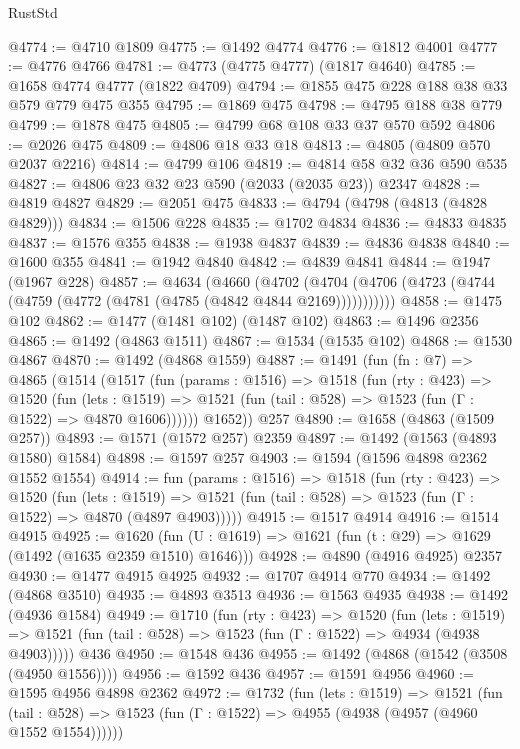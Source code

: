 \begin{lexlean}{RustStd}
\begin{coremodule}
{\begin{coremodule}
{{{{{{{{{{{{{@4774 := @4710 @1809
@4775 := @1492 @4774
@4776 := @1812 @4001
@4777 := @4776 @4766
@4781 := @4773 (@4775 @4777) (@1817 @4640)
@4785 := @1658 @4774 @4777 (@1822 @4709)
@4794 := @1855 @475 @228 @188 @38 @33 @579 @779 @475 @355
@4795 := @1869 @475
@4798 := @4795 @188 @38 @779
@4799 := @1878 @475
@4805 := @4799 @68 @108 @33 @37 @570 @592
@4806 := @2026 @475
@4809 := @4806 @18 @33 @18
@4813 := @4805 (@4809 @570 @2037 @2216)
@4814 := @4799 @106
@4819 := @4814 @58 @32 @36 @590 @535
@4827 := @4806 @23 @32 @23 @590 (@2033 (@2035 @23)) @2347
@4828 := @4819 @4827
@4829 := @2051 @475
@4833 := @4794 (@4798 (@4813 (@4828 @4829)))
@4834 := @1506 @228
@4835 := @1702 @4834
@4836 := @4833 @4835
@4837 := @1576 @355
@4838 := @1938 @4837
@4839 := @4836 @4838
@4840 := @1600 @355
@4841 := @1942 @4840
@4842 := @4839 @4841
@4844 := @1947 (@1967 @228)
@4857 := @4634
    (@4660
      (@4702 (@4704 (@4706 (@4723 (@4744 (@4759 (@4772 (@4781 (@4785 (@4842 @4844 @2169)))))))))))
@4858 := @1475 @102
@4862 := @1477 (@1481 @102) (@1487 @102)
@4863 := @1496 @2356
@4865 := @1492 (@4863 @1511)
@4867 := @1534 (@1535 @102)
@4868 := @1530 @4867
@4870 := @1492 (@4868 @1559)
@4887 := @1491
    (fun (fn : @7) =>
    @4865
      (@1514
        (@1517
          (fun (params : @1516) =>
          @1518
            (fun (rty : @423) =>
            @1520
              (fun (lets : @1519) =>
              @1521 (fun (tail : @528) => @1523 (fun (Γ : @1522) => @4870 @1606))))))
        @1652))
    @257
@4890 := @1658 (@4863 (@1509 @257))
@4893 := @1571 (@1572 @257) @2359
@4897 := @1492 (@1563 (@4893 @1580) @1584)
@4898 := @1597 @257
@4903 := @1594 (@1596 @4898 @2362 @1552 @1554)
@4914 := fun (params : @1516) =>
  @1518
    (fun (rty : @423) =>
    @1520
      (fun (lets : @1519) =>
      @1521 (fun (tail : @528) => @1523 (fun (Γ : @1522) => @4870 (@4897 @4903)))))
@4915 := @1517 @4914
@4916 := @1514 @4915
@4925 := @1620 (fun (U : @1619) => @1621 (fun (t : @29) => @1629 (@1492 (@1635 @2359 @1510) @1646)))
@4928 := @4890 (@4916 @4925) @2357
@4930 := @1477 @4915 @4925
@4932 := @1707 @4914 @770
@4934 := @1492 (@4868 @3510)
@4935 := @4893 @3513
@4936 := @1563 @4935
@4938 := @1492 (@4936 @1584)
@4949 := @1710
    (fun (rty : @423) =>
    @1520
      (fun (lets : @1519) =>
      @1521 (fun (tail : @528) => @1523 (fun (Γ : @1522) => @4934 (@4938 @4903)))))
    @436
@4950 := @1548 @436
@4955 := @1492 (@4868 (@1542 (@3508 (@4950 @1556))))
@4956 := @1592 @436
@4957 := @1591 @4956
@4960 := @1595 @4956 @4898 @2362
@4972 := @1732
    (fun (lets : @1519) =>
    @1521
      (fun (tail : @528) => @1523 (fun (Γ : @1522) => @4955 (@4938 (@4957 (@4960 @1552 @1554))))))
}}}}}}}}}}}}}
\end{coremodule}}
\end{coremodule}
\end{lexlean}
